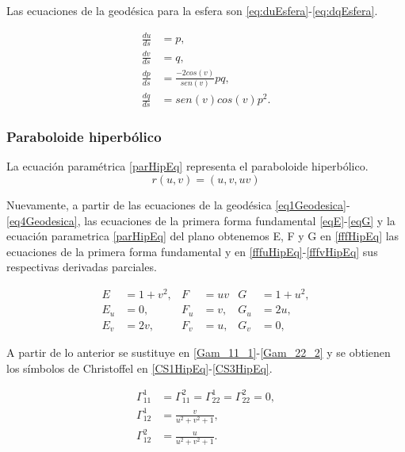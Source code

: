 \documentclass{endm}
\begin{document}
Las ecuaciones de la geod\'esica para la esfera son \ref{eq:duEsfera}-\ref{eq:dqEsfera}.

\begin{align}
\frac{du}{ds}&=p,\label{eq:duEsfera} \\
\frac{dv}{ds}&=q,\label{eq:dvEsfera}     \\
\frac{dp}{ds}&=\frac{-2cos(v)}{sen(v)} pq, \label{eq:dpEsfera}\\ 
\frac{dq}{ds}&= sen(v)cos(v) p^2. \label{eq:dqEsfera}
\end{align}

\subsubsection{Paraboloide hiperb\'olico}

La ecuaci\'on param\'etrica \ref{parHipEq} representa el paraboloide hiperb\'olico.
\begin{equation} \label{parHipEq}
r(u,v) = (u,v,uv)
\end{equation}

Nuevamente, a partir de las ecuaciones de la geod\'esica \ref{eq1Geodesica}-\ref{eq4Geodesica}, las ecuaciones de la primera forma fundamental \ref{eqE}-\ref{eqG} y la ecuaci\'on parametrica \ref{parHipEq} del plano obtenemos E, F y G en \ref{fffHipEq} las ecuaciones de la primera forma fundamental y en \ref{fffuHipEq}-\ref{fffvHipEq} sus respectivas derivadas parciales.

\begin{align}
E&=1+v^2,   & F &=uv    & G&=1+u^2, \label{fffHipEq} \\
E_u&=0,     & F_u&=v,   & G_u&=2u, \label{fffuHipEq}\\
E_v&=2v,    & F_v&=u,   & G_v&=0, \label{fffvHipEq}
\end{align}

A partir de lo anterior se sustituye en \ref{Gam_11_1}-\ref{Gam_22_2} y se obtienen los s\'imbolos de Christoffel en \ref{CS1HipEq}-\ref{CS3HipEq}.

\begin{align}
\Gamma_{11}^1&=\Gamma_{11}^2=\Gamma_{22}^1=\Gamma_{22}^2=0, \label{CS1HipEq} \\
\Gamma_{12}^1&=\frac{v}{u^2+v^2+1},  \label{CS2HipEq}   \\
\Gamma_{12}^2&=\frac{u}{u^2+v^2+1}.  \label{CS3HipEq}
\end{align}
\end{document}
